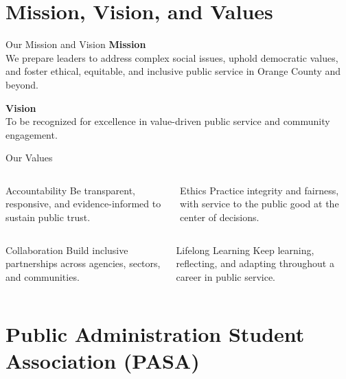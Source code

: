 \documentclass[10pt,aspectratio=169]{beamer}
\begin{document}
\section{\textcolor{titanorange}{Mission, Vision, and Values}}

\begin{frame}{Our Mission and Vision}
\textbf{Mission}\\
We prepare leaders to address complex social issues, uphold democratic values, and foster ethical, equitable, and inclusive public service in Orange County and beyond.

\vspace{0.8em}
\textbf{Vision}\\
To be recognized for excellence in value-driven public service and community engagement.
\end{frame}

\begin{frame}{Our Values}
\begin{columns}[T,onlytextwidth]
    \begin{block}{Accountability}
      Be transparent, responsive, and evidence-informed to sustain public trust.
    \end{block}

    \begin{block}{Ethics}
      Practice integrity and fairness, with service to the public good at the center of decisions.
    \end{block}
\end{columns}

\vspace{0.35em}
\begin{columns}[T,onlytextwidth]
    \begin{block}{Collaboration}
      Build inclusive partnerships across agencies, sectors, and communities.
    \end{block}

    \begin{block}{Lifelong Learning}
      Keep learning, reflecting, and adapting throughout a career in public service.
    \end{block}
\end{columns}
\end{frame}

\section{\textcolor{titanorange}{Public Administration Student Association (PASA)}}
\end{document}
